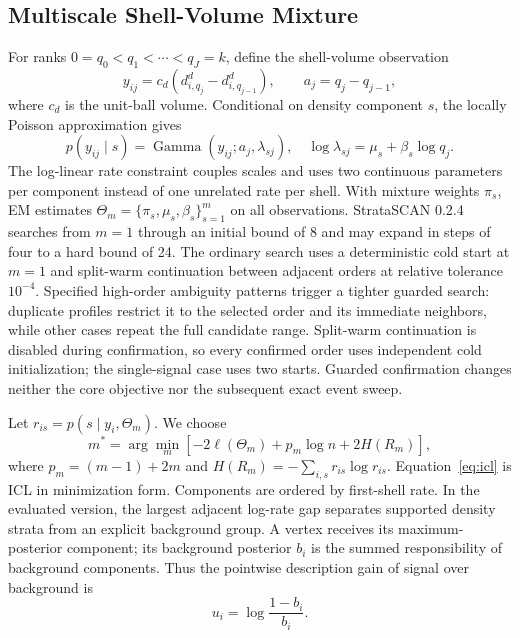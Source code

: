 \documentclass[conference]{IEEEtran}
\begin{document}
\subsection{Multiscale Shell-Volume Mixture}
For ranks $0=q_0<q_1<\cdots<q_J=k$, define the shell-volume observation
\begin{equation}
 y_{ij}=c_d\left(d_{i,q_j}^{d}-d_{i,q_{j-1}}^{d}\right),
 \qquad a_j=q_j-q_{j-1},
 \label{eq:shell}
\end{equation}
where $c_d$ is the unit-ball volume. Conditional on density component $s$, the locally Poisson approximation gives
\begin{equation}
 p(y_{ij}\mid s)=\operatorname{Gamma}(y_{ij};a_j,\lambda_{sj}),
 \quad \log\lambda_{sj}=\mu_s+\beta_s\log q_j.
 \label{eq:gamma}
\end{equation}
The log-linear rate constraint couples scales and uses two continuous parameters per component instead of one unrelated rate per shell. With mixture weights $\pi_s$, EM estimates $\Theta_m=\{\pi_s,\mu_s,\beta_s\}_{s=1}^{m}$ on all observations. StrataSCAN 0.2.4 searches from $m=1$ through an initial bound of 8 and may expand in steps of four to a hard bound of 24. The ordinary search uses a deterministic cold start at $m=1$ and split-warm continuation between adjacent orders at relative tolerance $10^{-4}$. Specified high-order ambiguity patterns trigger a tighter guarded search: duplicate profiles restrict it to the selected order and its immediate neighbors, while other cases repeat the full candidate range. Split-warm continuation is disabled during confirmation, so every confirmed order uses independent cold initialization; the single-signal case uses two starts. Guarded confirmation changes neither the core objective nor the subsequent exact event sweep.

Let $r_{is}=p(s\mid y_i,\Theta_m)$. We choose
\begin{equation}
 m^*=\arg\min_m\left[-2\ell(\Theta_m)+p_m\log n+2H(R_m)\right],
 \label{eq:icl}
\end{equation}
where $p_m=(m-1)+2m$ and $H(R_m)=-\sum_{i,s}r_{is}\log r_{is}$. Equation~\eqref{eq:icl} is ICL in minimization form. Components are ordered by first-shell rate. In the evaluated version, the largest adjacent log-rate gap separates supported density strata from an explicit background group. A vertex receives its maximum-posterior component; its background posterior $b_i$ is the summed responsibility of background components. Thus the pointwise description gain of signal over background is
\begin{equation}
 u_i=\log\frac{1-b_i}{b_i}.
 \label{eq:unary}
\end{equation}
\end{document}
